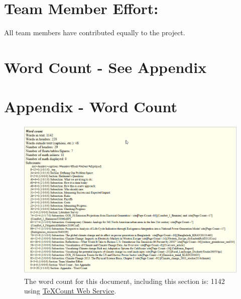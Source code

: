 \documentclass[sigconf,nonacm=true]{acmart}
\begin{document}
\section{Team Member Effort:}
All team members have contributed equally to the project.

\section{Word Count - See Appendix}




% 
\onecolumn
\newpage
\section*{Appendix - Word Count}

\begin{figure}[H]
	\includegraphics[width=0.9\linewidth]{images/wordCount}
	\caption{The word count for this document, including this section is: 1142 using \href{https://app.uio.no/ifi/texcount/online.php}{\color{blue}TeXCount Web Service}.}\label{fig:wordCount}
\end{figure}
\end{document}
